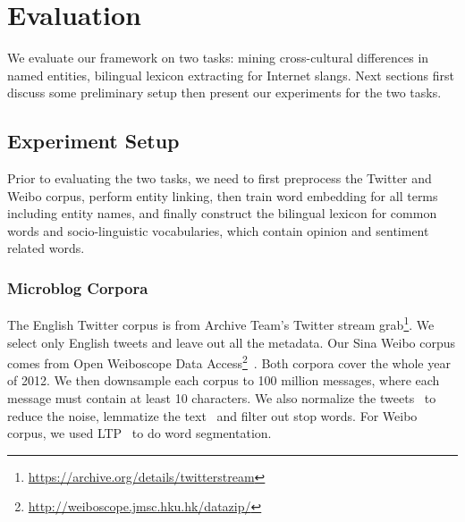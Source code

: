 \section{Evaluation}
\label{sec:eval}
We evaluate our framework on two tasks: mining cross-cultural differences in named
entities, bilingual lexicon extracting for Internet slangs. Next sections first  discuss some
preliminary setup then present our experiments for the two tasks.

\subsection{Experiment Setup}
\label{sec:prelim}
Prior to evaluating the two tasks, we need to first preprocess the Twitter and 
Weibo corpus, perform entity linking, then train word embedding for all terms including
entity names, and finally construct the bilingual lexicon for common words and
socio-linguistic vocabularies, which contain opinion and sentiment related words. 

\subsubsection{Microblog Corpora}
The English Twitter corpus is from Archive Team's Twitter stream 
grab\footnote{\url{https://archive.org/details/twitterstream}}.
We select only English tweets and leave out all the metadata.
Our Sina Weibo corpus comes from Open Weiboscope 
Data Access\footnote{\url{http://weiboscope.jmsc.hku.hk/datazip/}}~\cite{fu2013assessing}.
Both corpora cover the whole year of 2012. 
We then downsample each corpus to 100 million messages, where each message must
contain at least 10 characters. 
We also normalize the tweets~\cite{han2012automatically} to reduce the noise, lemmatize the text~\cite{manning2014stanford} and filter out stop words.
For Weibo corpus, we used LTP~\cite{che2010ltp} to do word segmentation.

